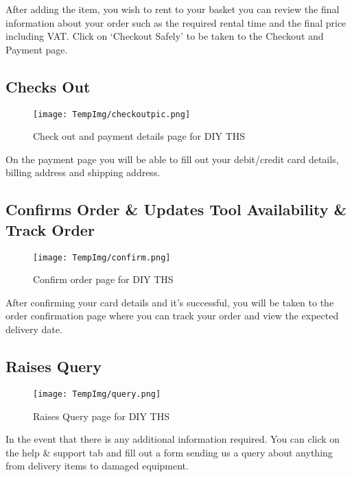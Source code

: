 \documentclass[fontsize=11pt]{extarticle}
\numberwithin{figure}{section} %
\numberwithin{table}{section}%
\begin{document}
After adding the item, you wish to rent to your basket you can review
the final information about your order such as the required rental time
and the final price including VAT. Click on `Checkout Safely' to be
taken to the Checkout and Payment page.

\hypertarget{checks-out}{%
\subsection{Checks Out}\label{checks-out}}

\begin{figure}[H]
      \centering
      \texttt{[image: TempImg/checkoutpic.png]}
      \caption{Check out and payment details page for DIY THS}
 \end{figure}

On the payment page you will be able to fill out your debit/credit card
details, billing address and shipping address.

\hypertarget{confirms-order-updates-tool-availability-track-order}{%
\subsection{Confirms Order \& Updates Tool Availability \& Track
Order}\label{confirms-order-updates-tool-availability-track-order}}

\begin{figure}[H]
      \centering
      \texttt{[image: TempImg/confirm.png]}
      \caption{Confirm order page for DIY THS}
 \end{figure}

After confirming your card details and it's successful, you will be
taken to the order confirmation page where you can track your order and
view the expected delivery date.

\hypertarget{raises-query}{%
\subsection{Raises Query}\label{raises-query}}

\begin{figure}[H]
      \centering
      \texttt{[image: TempImg/query.png]}
      \caption{Raises Query page for DIY THS}
 \end{figure}

In the event that there is any additional information required. You can
click on the help \& support tab and fill out a form sending us a query
about anything from delivery items to damaged equipment.
\end{document}
